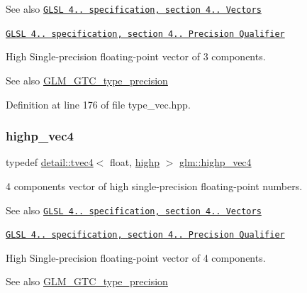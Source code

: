 \begin{DoxySeeAlso}{See also}
\href{http://www.opengl.org/registry/doc/GLSLangSpec.4.20.8.pdf}{\tt G\+L\+SL 4.. specification, section 4.. Vectors} 

\href{http://www.opengl.org/registry/doc/GLSLangSpec.4.20.8.pdf}{\tt G\+L\+SL 4.. specification, section 4.. Precision Qualifier}
\end{DoxySeeAlso}
High Single-\/precision floating-\/point vector of 3 components. \begin{DoxySeeAlso}{See also}
\hyperlink{group__gtc__type__precision}{G\+L\+M\+\_\+\+G\+T\+C\+\_\+type\+\_\+precision} 
\end{DoxySeeAlso}


Definition at line 176 of file type\+\_\+vec.\+hpp.

\mbox{\label{group__core__precision_gae32d5f99860247afbe7ed90564bceac1}} 
\subsubsection{\texorpdfstring{highp\+\_\+vec4}{highp\_vec4}}
{\footnotesize\ttfamily typedef \hyperlink{structglm_1_1detail_1_1tvec4}{detail\+::tvec4}$<$ float, \hyperlink{namespaceglm_a0f04f086094c747d227af4425893f545ac6f7eab42eacbb10d59a58e95e362074}{highp} $>$ \hyperlink{group__core__precision_gae32d5f99860247afbe7ed90564bceac1}{glm\+::highp\+\_\+vec4}}

4 components vector of high single-\/precision floating-\/point numbers.

\begin{DoxySeeAlso}{See also}
\href{http://www.opengl.org/registry/doc/GLSLangSpec.4.20.8.pdf}{\tt G\+L\+SL 4.. specification, section 4.. Vectors} 

\href{http://www.opengl.org/registry/doc/GLSLangSpec.4.20.8.pdf}{\tt G\+L\+SL 4.. specification, section 4.. Precision Qualifier}
\end{DoxySeeAlso}
High Single-\/precision floating-\/point vector of 4 components. \begin{DoxySeeAlso}{See also}
\hyperlink{group__gtc__type__precision}{G\+L\+M\+\_\+\+G\+T\+C\+\_\+type\+\_\+precision} 
\end{DoxySeeAlso}


